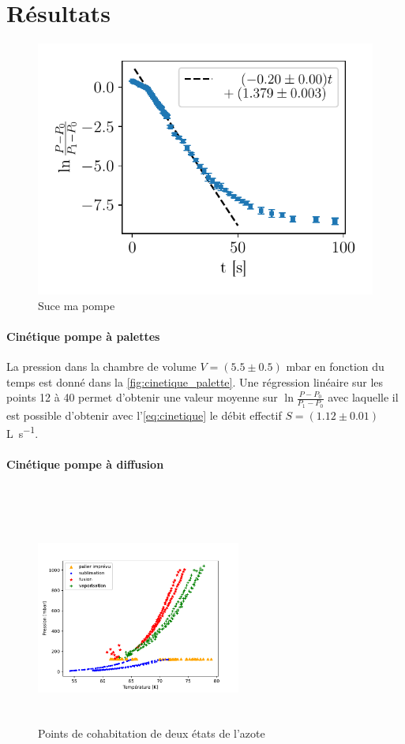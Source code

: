 \section{Résultats}

\begin{figure}
    \centering
    \includegraphics[width=0.5\linewidth]{figures/cinetique_palettes.pdf}
    \caption{Suce ma pompe}
    \label{fig:cinetique_palette}
\end{figure}

\paragraph*{Cinétique pompe à palettes}
La pression dans la chambre de volume \(V = (5.5 \pm 0.5)\) \si{\milli\bar} en fonction du temps est donné dans la \autoref{fig:cinetique_palette}. Une régression linéaire sur les points 12 à 40 permet d'obtenir une valeur moyenne sur \(\ln{\frac{P - P_0}{P_1 - P_0}}\) avec laquelle il est possible d'obtenir avec l'\autoref{eq:cinetique} le débit effectif \(S = (1.12 \pm 0.01)\) \si{\liter \per \second}.

\paragraph*{Cinétique pompe à diffusion}

 





 \\



\begin{figure}
    \centering
    \includegraphics[width=0.6\textwidth, height=7cm]{figures/etats_azote_all_data.pdf}
    \caption{Points de cohabitation de deux états de l'azote}
    \label{fig:alldata}
\end{figure}

